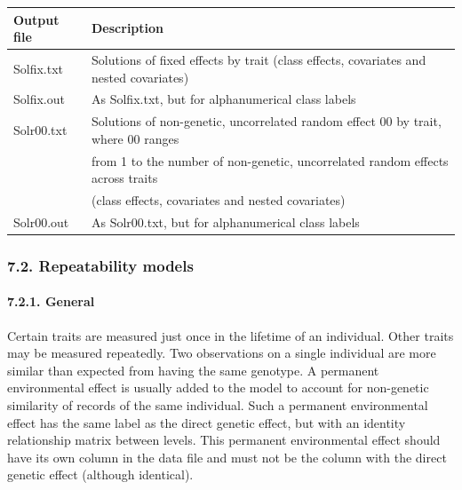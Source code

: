 {\def\LTcaptype{none} %
\begin{longtable}[]{@{}
  >{\raggedright\arraybackslash}p{}
  >{\raggedright\arraybackslash}p{}@{}}
\toprule\noalign{}
\begin{minipage}[b]{\linewidth}\raggedright
Output file
\end{minipage} & \begin{minipage}[b]{\linewidth}\raggedright
Description
\end{minipage} \\
\midrule\noalign{}
\endhead
\bottomrule\noalign{}
\endlastfoot
Solfix.txt & Solutions of fixed effects by trait (class effects,
covariates and nested covariates) \\
Solfix.out & As Solfix.txt, but for alphanumerical class labels \\
Solr00.txt & Solutions of non-genetic, uncorrelated random effect 00 by
trait, where 00 ranges \\
& from 1 to the number of non-genetic, uncorrelated random effects
across traits \\
& (class effects, covariates and nested covariates) \\
Solr00.out & As Solr00.txt, but for alphanumerical class labels \\
\end{longtable}
}

\subsubsection{7.2. Repeatability models}\label{Stat06}

\paragraph{7.2.1. General}\label{Stat07}

Certain traits are measured just once in the lifetime of an individual.
Other traits may be measured repeatedly. Two observations on a single
individual are more similar than expected from having the same genotype.
A permanent environmental effect is usually added to the model to
account for non-genetic similarity of records of the same individual.
Such a permanent environmental effect has the same label as the direct
genetic effect, but with an identity relationship matrix between levels.
This permanent environmental effect should have its own column in the
data file and must not be the column with the direct genetic effect
(although identical).

